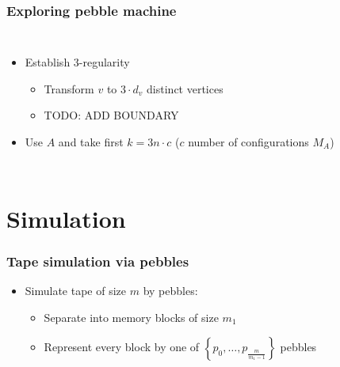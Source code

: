 \documentclass{beamer}
\begin{document}
\begin{frame}
  \frametitle{Exploring pebble machine}
  \begin{columns}
    \begin{itemize}
      \item<3-> Establish 3-regularity
        \begin{itemize}
          \item Transform $v$ to $3\cdot d_{v}$ distinct vertices
          \item TODO: ADD BOUNDARY
        \end{itemize}
      \item<5-> Use $A$ and take first $k = 3n\cdot c$ ($c$ number of
        configurations $M_{A}$)
    \end{itemize}
  \end{columns}
\end{frame}

\section{Simulation}
\begin{frame}
  \frametitle{Tape simulation via pebbles}
  \begin{itemize}
    \item Simulate tape of size $m$ by pebbles:
      \begin{itemize}
        \item<3-> Separate into memory blocks of size $m_{1}$
        \item<4-> Represent every block by one of $\left\{p_{0},\dots,p_{\frac{m}{m_{1}-1}}\right\}$ pebbles
      \end{itemize}
  \end{itemize}
\end{frame}
\end{document}
